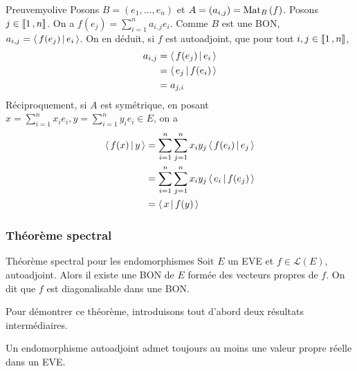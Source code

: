     \begin{demo}{Preuve}{myolive}
        Posons $B = (e_1,\ldots,e_n)$ et $A = (a_{i,j}) = \text{Mat}_{B}\left(f\right)$. Posons $j \in \left\llbracket 1 \, , n \right\rrbracket$. On a $f(e_j) = \sum_{i=1}^{n} a_{i,j}e_i$. Comme $B$ est une BON, $a_{i,j} = \left<\,f(e_j)\,\middle|\,e_i\,\right>$. On en déduit, si $f$ est autoadjoint, que pour tout $i,j \in \left\llbracket 1 \, , n \right\rrbracket$, 
        \begin{align*}
            a_{i,j} 
            &= \left<\,f(e_j)\,\middle|\,e_i\,\right> \\
            &= \left<\,e_j\,\middle|\,f(e_i)\,\right> \\
            &= a_{j,i}
        \end{align*}
        Réciproquement, si $A$ est symétrique, en posant $x = \sum_{i=1}^{n} x_i e_i, y = \sum_{i=1}^{n} y_i e_i \in E$, on a 
        \begin{align*}
            \left<\,f(x)\,\middle|\,y\,\right> 
            &= \sum_{i=1}^{n} \sum_{j=1}^{n} x_i y_j \left<\,f(e_i)\,\middle|\,e_j\,\right> \\
            &= \sum_{i=1}^{n} \sum_{j=1}^{n} x_i y_j \left<\,e_i\,\middle|\,f(e_j)\,\right> \\
            &= \left<\,x\,\middle|\,f(y)\,\right>
        \end{align*}
    \end{demo}

    \subsubsection{Théorème spectral}

    \begin{theo}{Théorème spectral pour les endomorphismes}
        Soit $E$ un EVE et $f \in \mathcal{L}(E)$, autoadjoint. Alors il existe une BON de $E$ formée des vecteurs propres de $f$. On dit que $f$ est diagonalisable dans une BON.
    \end{theo}

    Pour démontrer ce théorème, introduisons tout d’abord deux résultats intermédiaires.

    \begin{lem}{}{}
        Un endomorphisme autoadjoint admet toujours au moins une valeur propre réelle dans un EVE.
    \end{lem}

